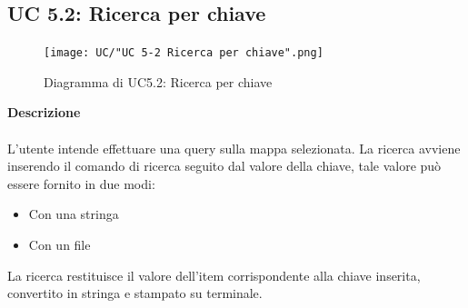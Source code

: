 \documentclass[a4paper]{article}
\begin{document}
		 
		 \subsection{UC 5.2: Ricerca per chiave}
	 \begin{figure}[H]
				\centering
				\texttt{[image: UC/"UC 5-2 Ricerca per chiave".png]}
				\caption{Diagramma di UC5.2: Ricerca per chiave}
			\end{figure}
	\textbf{Descrizione} 
	\\ \\
	L'utente intende effettuare una query sulla mappa selezionata. La ricerca avviene inserendo il comando di ricerca seguito dal valore della chiave, tale valore può essere fornito in due modi:
	\begin{itemize}
	\item Con una stringa 
	\item Con un file
	\end{itemize}
	La ricerca restituisce il valore dell'item corrispondente alla chiave inserita, convertito in stringa e stampato su terminale.
\end{document}
